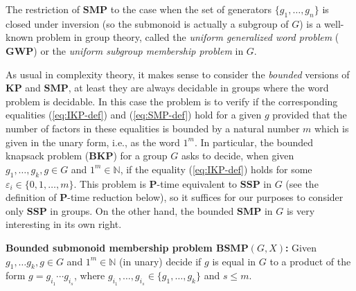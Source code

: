 \documentclass[10pt]{amsart}
\theoremstyle{definition}
\def\P{{\mathbf{P}}}
\def\SSP{{\mathbf{SSP}}}
\def\SMP{{\mathbf{SMP}}}
\def\BSMP{{\mathbf{BSMP}}}
\def\BKP{{\mathbf{BKP}}}
\def\KP{{\mathbf{KP}}}
\def\GWP{{\mathbf{GWP}}}
\begin{document}
\medskip
The restriction of $\SMP$ to the case when the set of generators $\{g_1, \ldots,g_n\}$ is closed under inversion (so the submonoid is actually a subgroup of $G$) is  a well-known problem in group theory, called the {\em uniform generalized word problem} ($\GWP$) or the {\em uniform subgroup membership problem} in $G$.

As usual in complexity theory, it makes sense to consider the {\em bounded} versions of $\KP$ and $\SMP$, at least they are always decidable in groups where the word problem is decidable. In this case the problem is to verify  if the corresponding equalities (\ref{eq:IKP-def}) and  (\ref{eq:SMP-def}) hold for a given $g$ provided that the number of factors in these equalities  is bounded by a natural number $m$ which is given in the unary form, i.e., as the word $1^m$. In particular, the bounded knapsack problem ($\BKP$) for a group $G$ asks to decide, when  given $g_1,\ldots,g_k,g\in G$ and $1^m\in\mathbb N$, if the equality (\ref{eq:IKP-def}) holds for some
$\varepsilon_i \in \{0,1, \ldots, m \}$.
This problem  is  $\P$-time equivalent to  $\SSP$ in $G$ (see the definition of $\P$-time reduction below), so it suffices for our purposes to consider only $\SSP$ in groups.
On the other hand,  the bounded $\SMP$ in $G$ is very interesting in its own right.


\medskip \noindent
{\bf Bounded submonoid membership problem $\BSMP(G,X)$\index{$\BSMP(G,X)$}:}
Given $g_1, \ldots g_k, g \in G$ and $1^m \in \mathbb{N}$ (in unary)
decide if $g$ is equal in $G$ to a product of the form
$g=g_{i_1}\cdots g_{i_s}$, where $g_{i_1}, \ldots, g_{i_s} \in \{g_1, \ldots, g_k\}$ and  $s\le m$.



\end{document}
